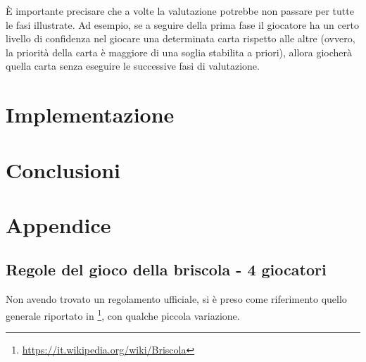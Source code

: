 \documentclass[a4paper,12pt]{article}
\begin{document}
È importante precisare che a volte la valutazione potrebbe non passare per tutte le fasi illustrate. Ad esempio, se a seguire della prima fase il giocatore ha un certo livello di confidenza nel giocare una determinata carta rispetto alle altre (ovvero, la priorità della carta è maggiore di una soglia stabilita a priori), allora giocherà quella carta senza eseguire le successive fasi di valutazione. 

\section{Implementazione} \label{implementation}

\section{Conclusioni} \label{conclusions}

\fancyhead{}
\renewcommand{\headrulewidth}{0pt}
\appendix
{}
\section*{Appendice}

\subsection*{Regole del gioco della briscola - 4 giocatori}\label{briscola-rules}

Non avendo trovato un regolamento ufficiale, si è preso come riferimento quello generale riportato in \footnote{\url{https://it.wikipedia.org/wiki/Briscola}}, con qualche piccola variazione.
 
\end{document}
